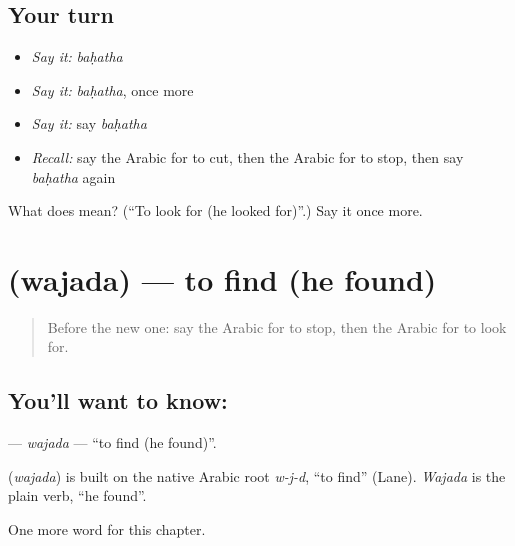 \subsection*{Your turn}
\begin{itemize}
\raggedright
  \item \emph{Say it:} \emph{baḥatha}
  \item \emph{Say it:} \emph{baḥatha}, once more
  \item \emph{Say it:} say \emph{baḥatha}
  \item \emph{Recall:} say the Arabic for to cut, then the Arabic for to stop, then say \emph{baḥatha} again
\end{itemize}

\begin{tcolorbox}[breakable,colback=teal!4,colframe=teal!35!black,title={Before you move on}]
What does  mean? (\textquotedblleft{}To look for (he looked for)\textquotedblright{}.) Say it once more.
\end{tcolorbox}
\section[\texorpdfstring{\ar{وجد} (wajada)}{وجد (wajada)}]{ (wajada) — to find (he found)}

\label{lesson:AR-C62-wajada}



\begin{quote}
Before the new one: say the Arabic for to stop, then the Arabic for to look for.
\end{quote}

\subsection*{You'll want to know: }
\textbf{} — \emph{wajada} — \textquotedblleft{}to find (he found)\textquotedblright{}.

\begin{cousinweb}
\textbf{} (\emph{wajada}) is built on the native Arabic root \emph{w-j-d}, \textquotedblleft{}to find\textquotedblright{} (Lane). \emph{Wajada} is the plain verb, \textquotedblleft{}he found\textquotedblright{}.
\end{cousinweb}

\begin{grammarlens}[title={What you've built}]
One more word for this chapter.
\end{grammarlens}

